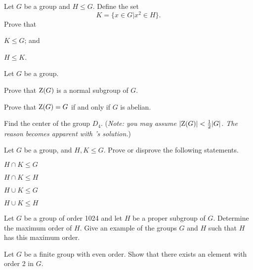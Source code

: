 \begin{problem}
    Let $G$ be a group and $H \leq G$. Define the set
    \[
        K = \{x \in G \vert x^2 \in H\}.
    \]
    Prove that
    \begin{partquestions}{\alph*}
        \item $K \leq G$; and
        \item $H \leq K$.
    \end{partquestions}
\end{problem}

\begin{problem}\label{problem-center-of-G}
    Let $G$ be a group.
    \begin{partquestions}{\alph*}
        \item Prove that $\mathrm{Z}(G)$ is a normal subgroup of $G$.
        \item Prove that $\mathrm{Z}(G) = G$ if and only if $G$ is abelian.
        \item Find the center of the group $D_4$.\newline
        (\textit{Note: you may assume $|\mathrm{Z}(G)| < \frac12 |G|$. The reason becomes apparent with 's solution.})
    \end{partquestions}
\end{problem}

\begin{problem}\label{problem-intersection-of-subgroups}
    Let $G$ be a group, and $H, K \leq G$. Prove or disprove the following statements.
    \begin{partquestions}{\alph*}
        \item $H \cap K \leq G$
        \item $H \cap K \leq H$
        \item $H \cup K \leq G$
        \item $H \cup K \leq H$
    \end{partquestions}
\end{problem}

\begin{problem}
    Let $G$ be a group of order 1024 and let $H$ be a proper subgroup of $G$. Determine the maximum order of $H$. Give an example of the groups $G$ and $H$ such that $H$ has this maximum order.
\end{problem}

\begin{problem}
    Let $G$ be a finite group with even order. Show that there exists an element with order 2 in $G$.
\end{problem}

